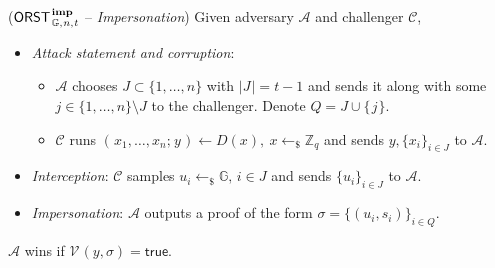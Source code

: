 \documentclass{iacrtrans}
\begin{document}
\begin{attack_game}\label{orst_attack_impersonation}
\vspace{3pt}
($
	\mathsf{ORST}
		_{\hspace{1pt}\mathbb{G},\hspace{0.5pt} n,\hspace{0.5pt} t}
		^{\hspace{1pt}\mathbf{imp}}
$
-- \textit{Impersonation})
Given adversary $\mathcal{A}$ and challenger $\mathcal{C}$,
\begin{itemize}[label=$\bullet$,leftmargin=20pt,rightmargin=0pt]
	\vspace{3pt}
	\item
		\textit{Attack statement and corruption}:
			\begin{itemize}[
				label=$\circ$,leftmargin=17pt,rightmargin=21pt
			]
			\vspace{3pt}
			\item $\mathcal{A}$ chooses $J \subset \{1, \dots, n\}$
				with $|J\hspace{1pt}| = t - 1$
				and sends it along with some
				$j \in \{1, \dots, n\} \setminus J$
				to the challenger.
				Denote $Q = J \cup \{\hspace{1pt}j\hspace{1pt}\}$.
				\vspace{3pt}
			\item $\mathcal{C}$ runs
				$(\hspace{1pt}x_1, \dots, x_n;\hspace{1pt} y\hspace{1pt})
				\leftarrow D(x), \ x \leftarrow_\$ \mathbb{Z}_q$
				and sends $y, \{x_i\}_{i \in J}$
				to $\mathcal{A}$.
			\vspace{5pt}
			\end{itemize}
	\item
		\textit{Interception}:
		$\mathcal{C}$ samples
		$u_i \leftarrow_\$ \mathbb{G},\hspace{2pt} i \in J$
		and sends $\{u_i\}_{i \in J}$
		to $\mathcal{A}$.\vspace{3pt}
	\item \textit{Impersonation}:
		$\mathcal{A}$ outputs a proof of the form
		$\sigma = \{(u_i, s_i)\}_{i \in Q}$.
\end{itemize}
\hspace*{5pt}%
\begin{minipage}{\dimexpr\textwidth-\parindent\relax}%
\vspace{5pt}
\hspace{3pt}
$\mathcal{A}$ wins if
$\mathcal{V}\hspace{1pt}(y, \sigma) = \textsf{true}$.
\end{minipage}%
\vspace{3pt}
\end{attack_game}
\end{document}
